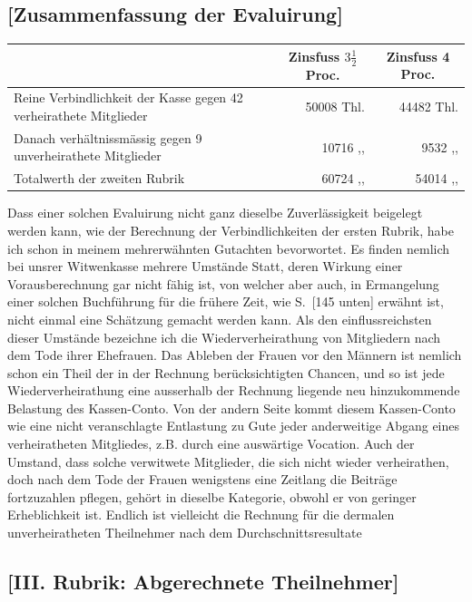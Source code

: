 \documentclass[12pt,a4paper]{article}
\begin{document}
\subsection*{[Zusammenfassung der Evaluirung]}

\begin{center}
\begin{tabular}{|l|r|r|}
\hline
 & \multicolumn{1}{c|}{Zinsfuss $3\frac{1}{2}$ Proc.} & \multicolumn{1}{c|}{Zinsfuss 4 Proc.} \\
\hline
Reine Verbindlichkeit der Kasse gegen 42 verheirathete Mitglieder & 50008 Thl. & 44482 Thl. \\
Danach verhältnissmässig gegen 9 unverheirathete Mitglieder & 10716 ,, & 9532 ,, \\
\hline
Totalwerth der zweiten Rubrik & 60724 ,, & 54014 ,, \\
\hline
\end{tabular}
\end{center}

Dass einer solchen Evaluirung nicht ganz dieselbe Zuverlässigkeit beigelegt werden kann, wie der Berechnung der Verbindlichkeiten der ersten Rubrik, habe ich schon in meinem mehrerwähnten Gutachten bevorwortet. Es finden nemlich bei unsrer Witwenkasse mehrere Umstände Statt, deren Wirkung einer Vorausberechnung gar nicht fähig ist, von welcher aber auch, in Ermangelung einer solchen Buchführung für die frühere Zeit, wie S.~[145 unten] erwähnt ist, nicht einmal eine Schätzung gemacht werden kann. Als den einflussreichsten dieser Umstände bezeichne ich die Wiederverheirathung von Mitgliedern nach dem Tode ihrer Ehefrauen. Das Ableben der Frauen vor den Männern ist nemlich schon ein Theil der in der Rechnung berücksichtigten Chancen, und so ist jede Wiederverheirathung eine ausserhalb der Rechnung liegende neu hinzukommende Belastung des Kassen-Conto. Von der andern Seite kommt diesem Kassen-Conto wie eine nicht veranschlagte Entlastung zu Gute jeder anderweitige Abgang eines verheiratheten Mitgliedes, z.B. durch eine auswärtige Vocation. Auch der Umstand, dass solche verwitwete Mitglieder, die sich nicht wieder verheirathen, doch nach dem Tode der Frauen wenigstens eine Zeitlang die Beiträge fortzuzahlen pflegen, gehört in dieselbe Kategorie, obwohl er von geringer Erheblichkeit ist. Endlich ist vielleicht die Rechnung für die dermalen unverheiratheten Theilnehmer nach dem Durchschnittsresultate

\subsection*{[III. Rubrik: Abgerechnete Theilnehmer]}
\end{document}
